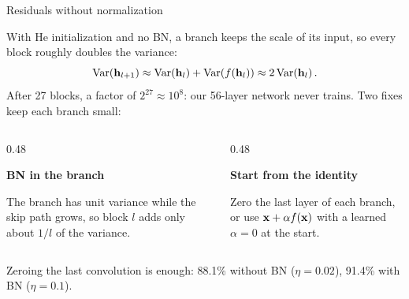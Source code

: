 \documentclass[11pt,aspectratio=169]{beamer}
\begin{document}
\begin{frame}{Residuals without normalization}
    \small
    \setlength{\parskip}{5pt}

    With He initialization and no BN, a branch keeps the scale of its input,
    so every block roughly doubles the variance:
    \[
        \text{Var}(\boldsymbol{\mathbf{h}}_{l+1}) \approx \text{Var}(\boldsymbol{\mathbf{h}}_l) + \text{Var}(f(\boldsymbol{\mathbf{h}}_l)) \approx 2\,\text{Var}(\boldsymbol{\mathbf{h}}_l) \,.
    \]
    After 27 blocks, a factor of $2^{27} \approx 10^8$: our 56-layer network
    never trains. Two fixes keep each branch small:

    \begin{columns}[T,onlytextwidth]
        \begin{column}{0.48\textwidth}
            \begin{tcolorbox}[nndsblue,courseheight={resfix}{}]
                \textbf{BN in the branch}

                The branch has unit variance while the skip path grows, so
                block $l$ adds only about $1/l$ of the variance.
            \end{tcolorbox}
        \end{column}
        \begin{column}{0.48\textwidth}
            \begin{tcolorbox}[nndsgreen,courseheight={resfix}{}]
                \textbf{Start from the identity}

                Zero the last layer of each branch, or use
                $\boldsymbol{\mathbf{x}} + \alpha f(\boldsymbol{\mathbf{x}})$ with a learned $\alpha = 0$
                at the start.
            \end{tcolorbox}
        \end{column}
    \end{columns}

    Zeroing the last convolution is enough: 88.1\% without BN ($\eta = 0.02$),
    91.4\% with BN ($\eta = 0.1$).


\end{frame}
\end{document}
